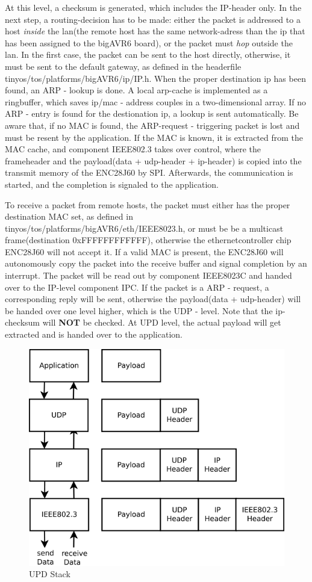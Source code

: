 At this level, a checksum is generated, which includes the IP-header only. In the next step, a routing-decision has to be made: either the packet is addressed to a host \textit{inside} the lan(the remote host has the same network-adress than the ip that has been assigned to the bigAVR6 board), or the packet must \textit{hop} outside the lan. In the first case, the packet can be sent to the host directly, otherwise, it must be sent to the default gateway, as defined in the headerfile tinyos/tos/platforms/bigAVR6/ip/IP.h. When the proper destination ip has been found, an ARP - lookup is done. A local arp-cache is implemented as a ringbuffer, which saves ip/mac - address couples in a two-dimensional array. If no ARP - entry is found for the destionation ip, a lookup is sent automatically. Be aware that, if no MAC is found, the ARP-request - triggering packet is lost and must be resent by the application. If the MAC is known, it is extracted from the MAC cache, and component IEEE802.3 takes over control, where the frameheader and the payload(data + udp-header + ip-header) is copied into the transmit memory of the ENC28J60 by SPI. Afterwards, the communication is started, and the completion is signaled to the application.

To receive a packet from remote hosts, the packet must either has the proper destination MAC set, as defined in tinyos/tos/platforms/bigAVR6/eth/IEEE8023.h, or must be be a multicast frame(destination 0xFFFFFFFFFFFF), otherwise the ethernetcontroller chip ENC28J60 will not accept it. If a valid MAC is present, the ENC28J60 will autonomously copy the packet into the receive buffer and signal completion by an interrupt. The packet will be read out by component IEEE8023C and handed over to the IP-level component IPC. If the packet is a ARP - request, a corresponding reply will be sent, otherwise the payload(data + udp-header) will be handed over one level higher, which is the UDP - level. Note that the ip-checksum will \textbf{NOT} be checked. At UPD level, the actual payload will get extracted and is handed over to the application.

\begin{figure}[h]
 \centerline{\includegraphics[width=.8\columnwidth]{pics/udpstack.png}}
  \caption{UPD Stack}
  \label{fig:udpstack}
\end{figure}




